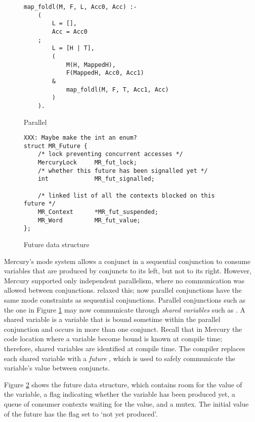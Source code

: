 

\begin{figure}
\begin{verbatim}
map_foldl(M, F, L, Acc0, Acc) :-
    (
        L = [],
        Acc = Acc0
    ;
        L = [H | T],
        (
            M(H, MappedH),
            F(MappedH, Acc0, Acc1)
        &
            map_foldl(M, F, T, Acc1, Acc)
        )
    ).
\end{verbatim}
\caption{Parallel \mapfoldl{}}
\label{fig:mapfoldl}
\end{figure}

\begin{figure}
\begin{verbatim}
XXX: Maybe make the int an enum?
struct MR_Future {
    /* lock preventing concurrent accesses */
    MercuryLock     MR_fut_lock;
    /* whether this future has been signalled yet */
    int             MR_fut_signalled;

    /* linked list of all the contexts blocked on this future */
    MR_Context      *MR_fut_suspended;
    MR_Word         MR_fut_value;
};
\end{verbatim}
\caption{Future data structure}
\label{fig:future}
\end{figure}

Mercury's mode system allows a conjunct in a sequential conjunction to consume
variables that are produced by conjuncts to its left, but not to its right.
However, Mercury supported only independent parallelism,
where no communication was allowed between conjunctions.
\citet{wang_dep_par_conj,wang_hons_thesis} relaxed this;
now parallel conjunctions have the same mode constraints as sequential
conjunctions.
Parallel conjunctions such as the one in Figure \ref{fig:mapfoldl} may now
communicate through \emph{shared variables} such as .
A shared variable is a variable that is bound sometime within the parallel
conjunction and occurs in more than one conjunct.
Recall that in Mercury the code location where a variable become bound is known
at compile time;
therefore,
shared variables are identified at compile time.
The compiler replaces each shared variable with a \emph{future} \citep{multilisp},
which is used to safely communicate the variable's value between conjuncts.

Figure \ref{fig:future} shows the future data structure,
which contains room for the value of the variable,
a flag indicating whether the variable has been produced yet,
a queue of consumer contexts waiting for the value, and a mutex.
The initial value of the future has the flag set to `not yet produced'.

